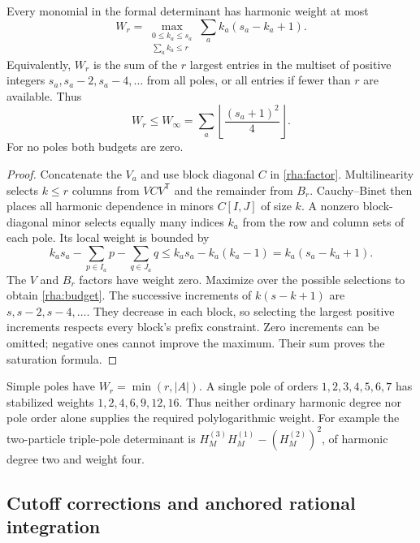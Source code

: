 \begin{theorem}\label{rha:capacity}
Every monomial in the formal determinant has harmonic weight at most
\begin{equation}\label{rha:budget}
 W_r=\max_{\substack{0\le k_a\le s_a\\\sum_a k_a\le r}}
              \sum_a k_a(s_a-k_a+1).
\end{equation}
Equivalently, $W_r$ is the sum of the $r$ largest entries in the multiset
of positive integers $s_a,s_a-2,s_a-4,\ldots$ from all poles, or all
entries if fewer than $r$ are available. Thus
\[
 W_r\le W_\infty=\sum_a\left\lfloor\frac{(s_a+1)^2}{4}\right\rfloor.
\]
For no poles both budgets are zero.
\end{theorem}
\begin{proof}
Concatenate the $V_a$ and use block diagonal $C$ in \eqref{rha:factor}.
Multilinearity selects $k\le r$ columns from $VCV^{\mathsf T}$ and
the remainder from $B_r$. Cauchy--Binet then places all harmonic
dependence in minors $C[I,J]$ of size $k$. A nonzero block-diagonal
minor selects equally many indices $k_a$ from the row and column sets
of each pole. Its local weight is bounded by
\[
 k_as_a-\sum_{p\in I_a}p-\sum_{q\in J_a}q
 \le k_as_a-k_a(k_a-1)=k_a(s_a-k_a+1).
\]
The $V$ and $B_r$ factors have weight zero. Maximize over the possible
selections to obtain \eqref{rha:budget}. The successive increments of
$k(s-k+1)$ are $s,s-2,s-4,\ldots$. They decrease in each block, so
selecting the largest positive increments respects every block's prefix
constraint. Zero increments can be omitted; negative ones cannot improve
the maximum. Their sum proves the saturation formula.
\end{proof}

Simple poles have $W_r=\min(r,|A|)$. A single pole of orders
$1,2,3,4,5,6,7$ has stabilized weights $1,2,4,6,9,12,16$.
Thus neither ordinary harmonic degree nor pole order alone supplies
the required polylogarithmic weight. For example the two-particle
triple-pole determinant is $H_M^{(3)}H_M^{(1)}-(H_M^{(2)})^2$,
of harmonic degree two and weight four.

\subsection{Cutoff corrections and anchored rational integration}

